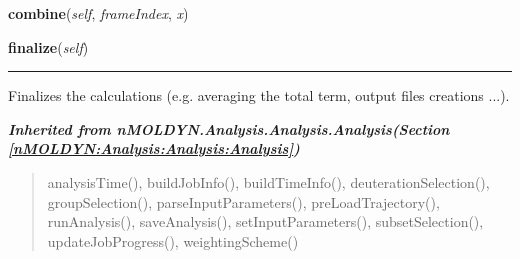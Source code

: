     \label{nMOLDYN:Analysis:Structure:CoordinationNumber:combine}

    \vspace{0.5ex}

\hspace{.8\funcindent}\begin{boxedminipage}{\funcwidth}

    \raggedright \textbf{combine}(\textit{self}, \textit{frameIndex}, \textit{x})

\setlength{\parskip}{2ex}
\setlength{\parskip}{1ex}
    \end{boxedminipage}

    \label{nMOLDYN:Analysis:Structure:CoordinationNumber:finalize}

    \vspace{0.5ex}

\hspace{.8\funcindent}\begin{boxedminipage}{\funcwidth}

    \raggedright \textbf{finalize}(\textit{self})

    \vspace{-1.5ex}

    \rule{\textwidth}{0.5\fboxrule}
\setlength{\parskip}{2ex}
    Finalizes the calculations (e.g. averaging the total term, output files
    creations ...).

\setlength{\parskip}{1ex}
    \end{boxedminipage}


\large{\textbf{\textit{Inherited from nMOLDYN.Analysis.Analysis.Analysis\textit{(Section \ref{nMOLDYN:Analysis:Analysis:Analysis})}}}}

\begin{quote}
analysisTime(), buildJobInfo(), buildTimeInfo(), deuterationSelection(), groupSelection(), parseInputParameters(), preLoadTrajectory(), runAnalysis(), saveAnalysis(), setInputParameters(), subsetSelection(), updateJobProgress(), weightingScheme()
\end{quote}


